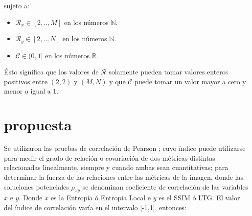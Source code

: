 \documentclass[spanish,twocolumn]{article}
\begin{document}

%
%
%
%
%

sujeto a:

\begin{itemize}
\item $\mathcal{R}_x \in [2,..,M]$ en los números $\mathbb{N}$.
\item $\mathcal{R}_y \in [2,..,N]$ en los números $\mathbb{N}$.
\item $\mathscr{C} \in (0,1]$ en los números $\mathbb{R}$.
\end{itemize}

Ésto significa que los valores de $\mathcal{R}$ solamente pueden tomar valores enteros positivos entre $(2,2)$ y $(M,N)$ y que $\mathscr{C}$ puede tomar un valor mayor a cero y menor o igual a 1.

\section{propuesta}
\label{sec:propuesta}
Se utilizaron las pruebas de correlación de Pearson \cite{correlacion}; cuyo índice puede utilizarse para medir el grado de relación o covariación de dos métricas distintas relacionadas linealmente,  siempre y cuando ambas sean cuantitativas; para determinar la fuerza de las relaciones entre las métricas de la imagen, donde las soluciones potenciales $\rho_{xy}$ se denominan coeficiente de correlación de las variables $x$ e $y$. Donde $x$ es la Entropía ó Entropía Local e $y$ es el SSIM ó LTG. El valor del  índice de correlación varía en el intervalo [-1,1], entonces:
\end{document}
